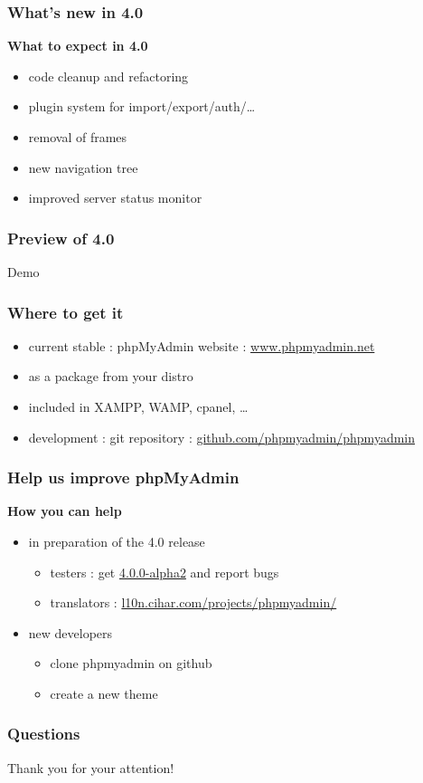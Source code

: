 \documentclass[14pt]{beamer}
\begin{document}
  \begin{frame}
    \frametitle{What's new in 4.0}
    \textbf{{\color{PmaOlive}What to expect in 4.0}}
    \pause
    \begin{itemize}[<+->]
      \item code cleanup and refactoring
      \item plugin system for import/export/auth/\ldots
      \item removal of frames
      \item new navigation tree
      \item improved server status monitor
    \end{itemize}
  \end{frame}
  \begin{frame}
     \frametitle{Preview of 4.0}
     Demo
  \end{frame}
  \begin{frame}
    \frametitle{Where to get it}
    \begin{itemize}[<+->]
      \item current stable : phpMyAdmin website : \href{http://www.phpmyadmin.net/}{www.phpmyadmin.net}
      \item as a package from your distro
      \item included in XAMPP, WAMP, cpanel, \ldots
      \item development : git repository :  \href{https://github.com/phpmyadmin/phpmyadmin}{github.com/phpmyadmin/phpmyadmin}
    \end{itemize}
  \end{frame}
  \begin{frame}
  \frametitle{Help us improve phpMyAdmin}
    \textbf{{\color{PmaOlive}How you can help}}
    \pause
    \begin{itemize}[<+->]
      \item in preparation of the 4.0 release
        \begin{itemize}[<+->]
	  \item testers : get \href{http://www.phpmyadmin.net/}{4.0.0-alpha2} and report bugs
	  \item translators : \href{https://l10n.cihar.com/projects/phpmyadmin/}{l10n.cihar.com/projects/phpmyadmin/}
	\end{itemize}
      \item new developers
	\begin{itemize}[<+->]
          \item clone phpmyadmin on github
          \item create a new theme
	\end{itemize}
    \end{itemize}
  \end{frame}
  \begin{frame}
  \frametitle{Questions}
    Thank you for your attention!
  \end{frame}
\end{document}
